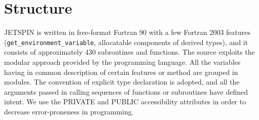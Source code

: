 
\section{Structure\label{sec:Structure}}

JETSPIN is written in free-format Fortran 90 with a few Fortran 2003
features (\texttt{get\_environment\_variable}, allocatable components of
derived types), and it consists of approximately 430 subroutines and
functions. The source exploits the modular approach provided
by the programming language. All the variables having in common description
of certain features or method are grouped in modules. The convention
of explicit type declaration is adopted, and all the arguments passed
in calling sequences of functions or subroutines have defined intent.
We use the PRIVATE and PUBLIC accessibility attributes in order to
decrease error-proneness in programming.

